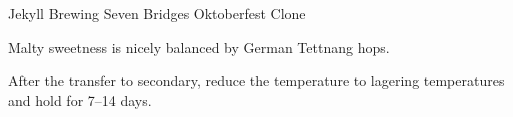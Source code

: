 \begin{recipe}{Jekyll Brewing Seven Bridges Oktoberfest Clone}

\begin{aboutblock}
Malty sweetness is nicely balanced by German Tettnang hops.
\sourceaha
\end{aboutblock}


\begin{methodandtiming}

\begin{mashsteps}
\end{mashsteps}

\begin{fermentationsteps}
\end{fermentationsteps}

\begin{directions}
After the transfer to secondary, reduce the temperature to lagering temperatures and
hold for 7--14 days.
\end{directions}

\end{methodandtiming}

\recipebreak

\begin{ingredientsblock}

\begin{malts}
\end{malts}

\begin{hops}
\end{hops}


\end{ingredientsblock}

\end{recipe}

